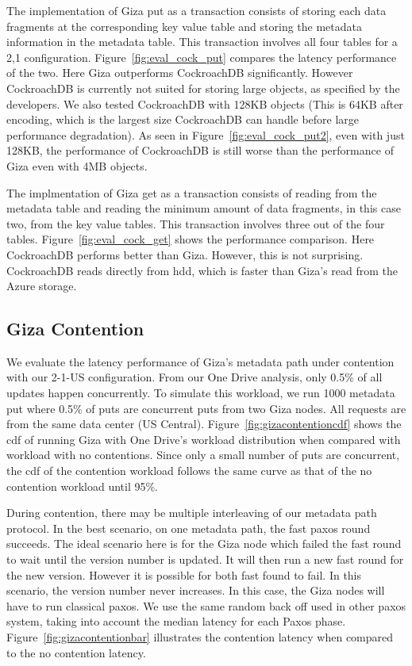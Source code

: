 The implementation of Giza put as a transaction consists of storing each data fragments at the corresponding key value table and storing the metadata information in the metadata table. This transaction involves all four tables for a 2,1 configuration. Figure~\ref{fig:eval_cock_put} compares the latency performance of the two. Here Giza outperforms CockroachDB significantly.
However CockroachDB is currently not suited for storing large objects, as specified by the developers. We also tested CockroachDB with 128KB objects (This is 64KB after encoding, which is the largest size CockroachDB can handle before large performance degradation). As seen in Figure~\ref{fig:eval_cock_put2}, even with just 128KB, the performance of CockroachDB is still worse than the performance of Giza even with 4MB objects.

The implmentation of Giza get as a transaction consists of reading from the metadata table and reading the minimum amount of data fragments, in this case two, from the key value tables. This transaction involves three out of the four tables. Figure~\ref{fig:eval_cock_get} shows the performance comparison. Here CockroachDB performs better than Giza. However, this is not surprising. CockroachDB reads directly from hdd, which is faster than Giza's read from the Azure storage.

\subsection{Giza Contention}
We evaluate the latency performance of Giza’s metadata path under contention with our 2-1-US configuration. From our One Drive analysis, only 0.5\% of all updates happen concurrently. To simulate this workload, we run 1000 metadata put where 0.5\% of puts are concurrent puts from two Giza nodes. All requests are from the same data center (US Central). Figure~\ref{fig:gizacontentioncdf} shows the cdf of running Giza with One Drive’s workload distribution when compared with workload with no contentions. Since only a small number of puts are concurrent, the cdf of the contention workload follows the same curve as that of the no contention workload until 95\%. 

During contention, there may be multiple interleaving of our metadata path protocol. In the best scenario, on one metadata path, the fast paxos round succeeds. The ideal scenario here is for the Giza node which failed the fast round to wait until the version number is updated. It will then run a new fast round for the new version. However it is possible for both fast found to fail. In this scenario, the version number never increases. In this case, the Giza nodes will have to run classical paxos. We use the same random back off used in other paxos system, taking into account the median latency for each Paxos phase. Figure~\ref{fig:gizacontentionbar}  illustrates the contention latency when compared to the no contention latency.

